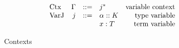 \documentclass[../main.tex]{subfiles}
\begin{document}
\begin{figure*}[t]
    \[\begin{array}{lrclr}
        \textrm{Ctx} & \Gamma  & ::= & j^*                              & \textrm{variable context}     \\
        \textrm{VarJ}   & j       & ::= & \alpha :: K                & \textrm{type variable}              \\
                        &         &     & x : T                     & \textrm{term variable}              \\
    \end{array}\]
    
    \caption{Contexts}
    \label{fig:Plutus_core_contexts}
\end{figure*}
\end{document}
